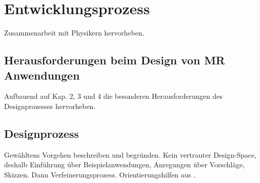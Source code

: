 \section{Entwicklungsprozess}
\label{sec-5}

Zusammenarbeit mit Physikern hervorheben.

\subsection{Herausforderungen beim Design von MR Anwendungen}
Aufbauend auf Kap. 2, 3 und 4 die besonderen Herausforderungen des Designprozesses hervorheben. 

\subsection{Designprozess}
Gewähltens Vorgehen beschreiben und begründen.
Kein vertrauter Design-Space, deshalb Einführung über Beispielanwendungen, Anregungen über Vorschläge, Skizzen. Dann Verfeinerungsprozess. Orientierungshilfen aus \cite{Pell2017}. 

